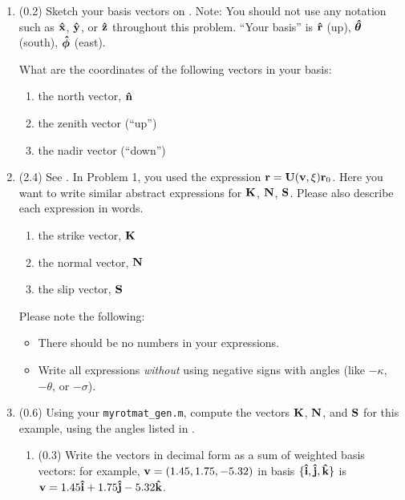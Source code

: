 \documentclass[11pt,titlepage,fleqn]{article}
\newcommand{\rotangB}{\xi}    %
\newcommand{\rotvec}{\bv}      %
\begin{document}
\begin{enumerate}


\item (0.2) Sketch your basis vectors on . Note: You should not use any notation such as $\mbox{\boldmath{$\hat{\rm x}$}}$, $\mbox{\boldmath{$\hat{\rm y}$}}$, or $\mbox{\boldmath{$\hat{\rm z}$}}$ throughout this problem. ``Your basis'' is $\mbox{\boldmath{$\hat{\rm r}$}}$ (up), $\mbox{\boldmath{$\hat{\theta}$}}$ (south), $\mbox{\boldmath{$\hat{\phi}$}}$ (east).

What are the coordinates of the following vectors in your basis:

\begin{enumerate}
\item the north vector, $\mbox{\boldmath{$\hat{\rm n}$}}$

\item the zenith vector (``up'')

\item the nadir vector (``down'')
\end{enumerate}


\item (2.4) See . In Problem 1, you used the expression $\br = \bU(\rotvec,\rotangB)\br_0$. Here you want to write similar abstract expressions for $\mbox{${\bf K}$}$, $\mbox{${\bf N}$}$, $\mbox{${\bf S}$}$. Please also describe each expression in words.
%
\begin{enumerate}
\item the strike vector, $\mbox{${\bf K}$}$
\item the normal vector, $\mbox{${\bf N}$}$
\item the slip vector, $\mbox{${\bf S}$}$
\end{enumerate}
%
Please note the following:
%
\begin{itemize}
\item There should be no numbers in your expressions.
\item Write all expressions {\em without} using negative signs with angles (like $-\kappa$, $-\theta$, or $-\sigma$).
\end{itemize}


\item (0.6) Using your \verb+myrotmat_gen.m+, compute the vectors $\mbox{${\bf K}$}$, $\mbox{${\bf N}$}$, and $\mbox{${\bf S}$}$ for this example, using the angles listed in .
%
\begin{enumerate}
\item (0.3) Write the vectors in decimal form as a sum of weighted basis vectors: for example, $\mbox{${\bf v}$} = (1.45,1.75,-5.32)$ in basis $\{\mbox{\boldmath{$\hat{\rm i}$}},\mbox{\boldmath{$\hat{\rm j}$}},\mbox{\boldmath{$\hat{\rm k}$}}\}$ is $\rotvec = 1.45\bih + 1.75\bjh - 5.32\bkh$.


\end{enumerate}
\end{enumerate}
\end{document}

